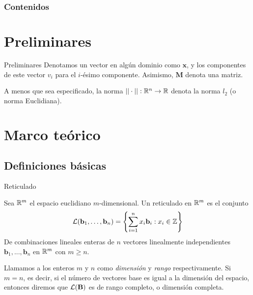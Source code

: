 


\frame{\titlepage}

\begin{frame}
\frametitle{Contenidos}
\tableofcontents
\end{frame}

\section{Preliminares}
\begin{frame}{Preliminares}
Denotamos un vector en algún dominio como $\mathbf x$, y los componentes de este vector $v_i$ para el $i$-ésimo componente. Asimismo, $\mathbf M$ denota una matriz.

A menos que sea especificado, la norma $||\cdot ||: \mathbb{R}^n \to \mathbb{R}$ denota la norma $l_2$ (o norma Euclidiana).

\end{frame}
\section{Marco teórico}



\subsection{Definiciones básicas}
\begin{frame}{Reticulado}
\begin{definition}
Sea $\mathbb{R}^m$ el espacio euclidiano $m$-dimensional. Un reticulado en $\mathbb{R}^m$ es el conjunto
\[
\mathcal L(\mathbf{b}_1, \dots, \mathbf{b}_n) = \left\{\sum_{i = 1}^n x_i \mathbf{b}_i : x_i  \in \mathbb{Z}\right\}
\]
De combinaciones lineales enteras de $n$ vectores linealmente independientes $\mathbf{b}_1, ..., \mathbf{b}_n$ en $\mathbb{R}^m$ con $m \geq n$.
\end{definition}
Llamamos a los enteros $m$ y $n$ como {\it dimensión} y {\it rango} respectivamente. Si $m = n$, es decir, si el número de vectores base es igual a la dimensión del espacio, entonces diremos que $\mathcal{L}(\mathbf{B})$ es de rango completo, o dimensión completa.
\end{frame}

